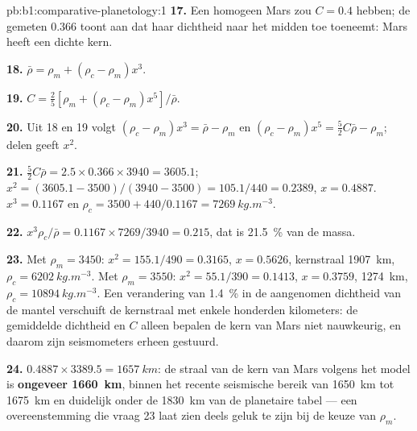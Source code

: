 \begin{solution}{pb:b1:comparative-planetology:1}
\textbf{17.} Een homogeen Mars zou $C = 0.4$ hebben; de gemeten 0.366 toont aan dat haar dichtheid
naar het midden toe toeneemt: Mars heeft een dichte kern.

\textbf{18.} $\bar\rho = \rho_m + (\rho_c - \rho_m)x^3$.

\textbf{19.} $C = \tfrac25[\rho_m + (\rho_c - \rho_m)x^5]/\bar\rho$.

\textbf{20.} Uit 18 en 19 volgt $(\rho_c - \rho_m)x^3 = \bar\rho - \rho_m$ en
$(\rho_c - \rho_m)x^5 = \tfrac52C\bar\rho - \rho_m$; delen geeft $x^2$.

\textbf{21.} $\tfrac52C\bar\rho = 2.5\times0.366\times3940 = 3605.1$;
$x^2 = (3605.1 - 3500)/(3940 - 3500) = 105.1/440 = 0.2389$, $x = 0.4887$.
$x^3 = 0.1167$ en $\rho_c = 3500 + 440/0.1167 = \qty{7269}{kg.m^{-3}}$.

\textbf{22.} $x^3\rho_c/\bar\rho = 0.1167\times7269/3940 = 0.215$, dat is
\qty{21.5}{\percent} van de massa.

\textbf{23.} Met $\rho_m = 3450$: $x^2 = 155.1/490 = 0.3165$, $x = 0.5626$,
kernstraal \qty{1907}{km}, $\rho_c = \qty{6202}{kg.m^{-3}}$. Met $\rho_m =
3550$: $x^2 = 55.1/390 = 0.1413$, $x = 0.3759$, \qty{1274}{km},
$\rho_c = \qty{10894}{kg.m^{-3}}$. Een verandering van \qty{1.4}{\percent} in de
aangenomen dichtheid van de mantel verschuift de kernstraal met enkele honderden kilometers:
de gemiddelde dichtheid en $C$ alleen bepalen de kern van Mars niet nauwkeurig, en daarom zijn
seismometers erheen gestuurd.

\textbf{24.} $0.4887\times3389.5 = \qty{1657}{km}$: de straal van de kern
van Mars volgens het model is \textbf{ongeveer \qty[text-series-to-math=true]{1660}{km}}, binnen het
recente seismische bereik van \qty{1650}{km} tot \qty{1675}{km} en duidelijk onder de
\qty{1830}{km} van de planetaire tabel --- een overeenstemming die vraag 23 laat zien deels
geluk te zijn bij de keuze van $\rho_m$.
\end{solution}
